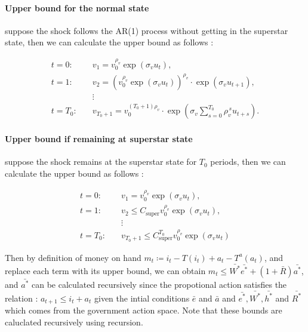 \documentclass[11pt]{article}
\begin{document}
\paragraph{Upper bound for the normal state}
suppose the shock follows the AR(1) process without getting in the 
superstar state, then we can calculate the upper bound as follows :

\begin{equation*}
\begin{aligned}
    t = 0: \quad & v_{1} = v_{0}^{\rho_v} \exp\!\left(\sigma_v u_{t}\right), \\
    t = 1: \quad & v_{2} = \left(v_{0}^{\rho_v} \exp\!\left(\sigma_v u_{t}\right)\right)^{\rho_v} 
                    \cdot \exp\!\left(\sigma_v u_{t+1}\right), \\
    & \vdots \\
    t = T_0: \quad & v_{T_0+1} = v_{0}^{(T_0+1)\rho_v} 
      \cdot \exp\!\left(\sigma_v \sum_{s=0}^{T_0} \rho_v^{\,s} u_{t+s}\right).
\end{aligned}
\end{equation*}

\paragraph{Upper bound if remaining at superstar state}
suppose the shock remains at the superstar state for $T_0$ periods, then we can calculate the upper bound as follows :

\begin{equation*}
  \begin{aligned}
    t = 0: \quad & v_{1} = v_{0}^{\rho_v} \exp\!\left(\sigma_v u_{t}\right), \\
    t = 1: \quad & v_{2} \leq C_{\text{super}}v_{0}^{\rho_v} \exp\!\left(\sigma_v u_{t}\right), \\
    & \vdots \\
    t = T_0: \quad & v_{T_0+1} \leq C_{\text{super}}^{T_0}v_{0}^{\rho_v} \exp\!\left(\sigma_v u_{t}\right)
  \end{aligned}
\end{equation*}

Then by definition of money on hand $m_t \coloneqq i_t - T(i_t) + a_t - T^{a}(a_t)$, and replace each term with its upper bound, 
we can obtain $m_t \leq \bar{W^*} \bar{e^*} + \left(1+\bar{R}\right) \bar{a^*}$, 
and $\bar{a^*}$ can be calculated recursively since the propotional action satisfies the relation : 
$a_{t+1} \leq i_t + a_t$ given the intial conditions $\bar{e}$ and $\bar{a}$ and $\bar{e^*}, \bar{W^*}, \bar{h^*}$ and $\bar{R^*}$ which comes from the government action space. Note that these bounds are caluclated recursively using recursion. 
\end{document}
